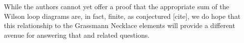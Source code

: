 \documentclass[11pt]{article}
\theoremstyle{remark}
\theoremstyle{definition}
\begin{document}
While the authors cannot yet offer a proof that the appropriate sum of the Wilson loop diagrams are, in fact, finite, as conjectured [cite], we do hope that this relationship to the Grassmann Necklace elements will provide a different avenue for answering that and related questions. 














\end{document}
